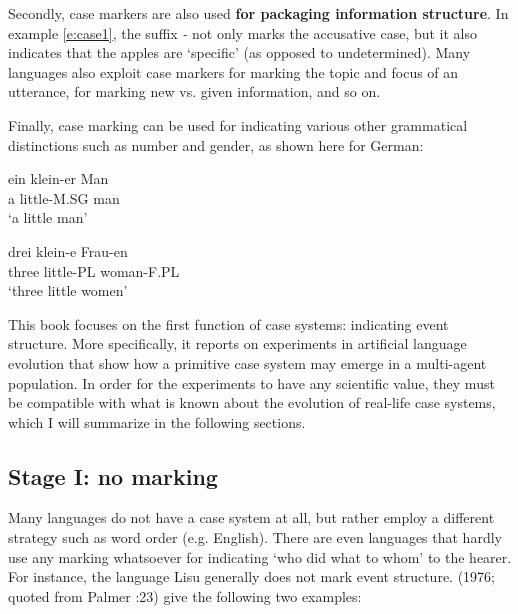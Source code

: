Secondly, case markers are also used {\bfseries for packaging information structure}. In example \ref{e:case1}, the suffix {\em -\textiota} not only marks the accusative case, but it also indicates that the apples are `specific' (as opposed to undetermined). Many languages also exploit case markers for marking the topic and focus of an utterance, for marking new vs. given information, and so on.

Finally, case marking can be used for indicating various other grammatical distinctions such as number and gender, as shown here for German:

\ea
\gll ein klein-er Man \\
a little-M.SG man \\
\glt `a little man' \\
\z

\ea
\gll drei klein-e Frau-en \\ 
three little-PL woman-F.PL \\
\glt `three little women' \\
\z

This book focuses on the first function of case systems: indicating event structure. More specifically, it reports on experiments in artificial language evolution that show how a primitive case system may emerge in a multi-agent population. In order for the experiments to have any scientific value, they must be compatible with what is known about the evolution of real-life case systems, which I will summarize in the following sections.

\subsection{Stage I: no marking}
\label{s:stage1}

Many languages do not have a case system at all, but rather employ a different strategy such as word order (e.g. English). There are even languages that hardly use any marking whatsoever for indicating `who did what to whom' to the hearer. For instance, the language Lisu generally does not mark event structure. \citeauthor{li76subject} (1976; quoted from Palmer \citeyear{palmer94grammatical}:23) give the following two examples:

\eal
{}
\zl

